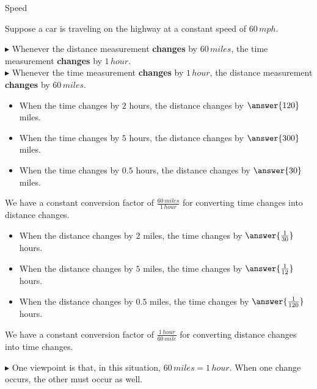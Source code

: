 \documentclass{ximera}
\begin{document}
\begin{example} Speed


Suppose a car is traveling on the highway at a constant speed of $60 \, mph$.


$\blacktriangleright$ Whenever the distance measurement \textbf{\textcolor{purple!85!blue}{changes}} by $60 \, miles$, the time measurement \textbf{\textcolor{purple!85!blue}{changes}} by $1 \, hour$. \\
$\blacktriangleright$ Whenever the time measurement \textbf{\textcolor{purple!85!blue}{changes}} by $1 \, hour$, the distance measurement \textbf{\textcolor{purple!85!blue}{changes}} by $60 \, miles$. \\




\begin{itemize}
\item When the time changes by $2$ hours, the distance changes by $\answer{120}$ miles. 
\item When the time changes by $5$ hours, the distance changes by $\answer{300}$ miles. 
\item When the time changes by $0.5$ hours, the distance changes by $\answer{30}$ miles. 
\end{itemize}



We have a constant conversion factor of $\frac{60 \, miles}{1 \, hour}$ for converting time changes into distance changes. 






\begin{itemize}
\item When the distance changes by $2$ miles, the time changes by $\answer{\frac{1}{30}}$ hours. 
\item When the distance changes by $5$ miles, the time changes by $\answer{\frac{1}{12}}$ hours. 
\item When the distance changes by $0.5$ miles, the time changes by $\answer{\frac{1}{120}}$ hours. 
\end{itemize}



We have a constant conversion factor of $\frac{1 \, hour}{60 \, mile}$ for converting distance changes into time changes. 




$\blacktriangleright$ One viewpoint is that, in this situation, $60 \, miles = 1 \, hour$.  When one change occurs, the other must occur as well.





\end{example} 
\end{document}
